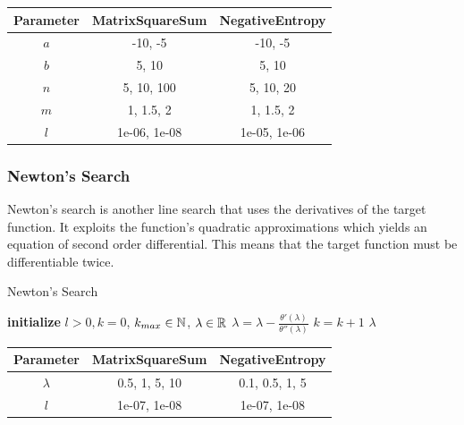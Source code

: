 \documentclass[a4paper,english,titlepage,12pt]{article}
\newcommand{\abs}[1]{\ensuremath|#1|}
\newcommand{\R}{\ensuremath\mathbb{R}}
\newcommand{\N}{\ensuremath\mathbb{N}}
\begin{document}
\begin{table}[H]
\label{tab:params_UniformSearch}
\centering
{}
\begin{tabular}{|c|c|c|}
\hline
\rowcolor{gray!25}
Parameter & MatrixSquareSum & NegativeEntropy \\
\hline
$a$ & -10, -5 & -10, -5 \\
$b$ & 5, 10 & 5, 10 \\
$n$ & 5, 10, 100 & 5, 10, 20 \\
$m$ & 1, 1.5, 2 & 1, 1.5, 2 \\
$l$ & 1e-06, 1e-08 & 1e-05, 1e-06 \\
\hline
\end{tabular}
\end{table}


\subsubsection{Newton's Search}


Newton's search is another line search that uses the derivatives of the target function. It exploits the function's quadratic approximations which yields an equation of second order differential. This means that the target function must be differentiable twice. \cite{book:nonlinear_programming}

\begin{algorithm}[H]
\caption{Newton's Search}
\label{alg_newtons_search}
\begin{algorithmic}[1]
\STATE \textbf{initialize} $l > 0, k = 0$, $k_{max} \in \N$, $\lambda \in \R$
\WHILE{$\abs{\theta'(\lambda)} > l$ \AND $k < k_{max}$}
    \STATE $\lambda = \lambda -\frac{\theta'(\lambda)}{\theta''(\lambda)}$
    \STATE $k = k + 1$
\ENDWHILE
\RETURN $\lambda$
\end{algorithmic}
\end{algorithm}

\begin{table}[H]
\label{tab:params_NewtonsSearch}
\centering
{}
\begin{tabular}{|c|c|c|}
\hline
\rowcolor{gray!25}
Parameter & MatrixSquareSum & NegativeEntropy \\
\hline
$\lambda$ & 0.5, 1, 5, 10 & 0.1, 0.5, 1, 5 \\
$l$ & 1e-07, 1e-08 & 1e-07, 1e-08 \\
\hline
\end{tabular}
\end{table}
\end{document}
